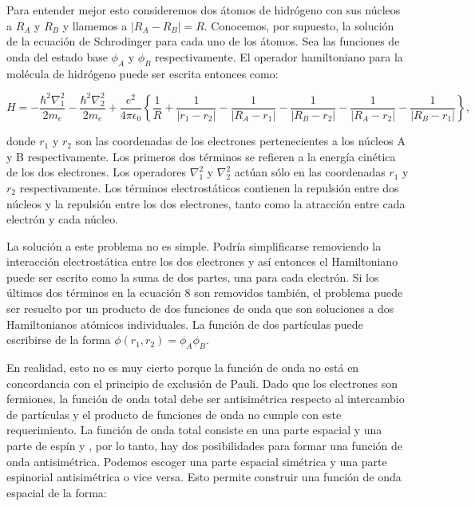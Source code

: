 \documentclass{article}
\providecommand{\abs}[1]{\lvert#1\rvert} %
\begin{document}
Para entender mejor esto consideremos dos átomos de hidrógeno con sus núcleos a $R_{A}$ y $R_{B}$ y llamemos a $\abs{R_{A}- R_{B}} = R$. Conocemos, por supuesto, la solución de la ecuación de Schrodinger para cada uno de los átomos. Sea las funciones de onda del estado base $\phi_{A}$ y $\phi_{B}$ respectivamente. El operador hamiltoniano para la molécula de hidrógeno puede ser escrita entonces como:

\begin{equation}
    H= -\frac{\hbar^{2} \nabla^{2}_{1}}{2m_{e}}-\frac{\hbar^{2} \nabla^{2}_{2}}{2m_{e}}+\frac{e^{2}}{4\pi \epsilon_{0}}\left\lbrace{\frac{1}{R} + \frac{1}{\abs{r_{1}-r_{2}}} - \frac{1}{\abs{R_{A}-r_{1}}} - \frac{1}{\abs{R_{B}-r_{2}}} - \frac{1}{\abs{R_{A}-r_{2}}} - \frac{1}{\abs{R_{B}-r_{1}}} }\right\rbrace,
\end{equation}

donde $r_{1}$ y $r_{2}$ son las coordenadas de los electrones pertenecientes a los núcleos A y B respectivamente. Los primeros dos términos se refieren a la energía cinética de los dos electrones. Los operadores $\nabla^{2}_{1}$ y $\nabla^{2}_{2}$ actúan sólo en las coordenadas $r_{1}$ y $r_{2}$ respectivamente. Los términos electrostáticos contienen la repulsión entre dos núcleos y la repulsión entre los dos electrones, tanto como la atracción entre cada electrón y cada núcleo.

La solución a este problema no es simple. Podría simplificarse removiendo la interacción electrostática entre los dos electrones y así entonces el Hamiltoniano puede ser escrito como la suma de dos partes, una para cada electrón. Si los últimos dos términos en la ecuación 8 son removidos también, el problema puede ser resuelto por un producto de dos funciones de onda que son soluciones a dos Hamiltonianos atómicos individuales. La función de dos partículas puede escribirse de la forma $\phi(r_{1}, r_{2}) = \phi_{A}\phi_{B}$. \cite{Hofmann}

En realidad, esto no es muy cierto porque la función de onda no está en concordancia con el principio de exclusión de Pauli. Dado que los electrones son fermiones, la función de onda total debe ser antisimétrica respecto al intercambio de partículas y el producto de funciones de onda no cumple con este requerimiento. La función de onda total consiste en una parte espacial y una parte de espín y , por lo tanto, hay dos posibilidades para formar una función de onda antisimétrica. Podemos escoger una parte espacial simétrica y una parte espinorial antisimétrica o vice versa. Esto permite construir una función de onda espacial de la forma:
\end{document}
